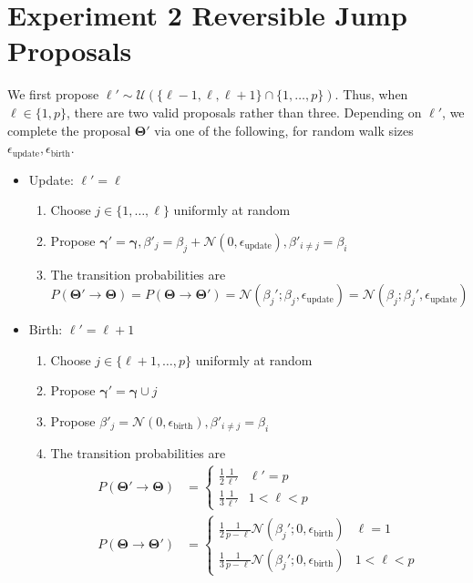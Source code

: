 \documentclass[a4paper,12pt]{article}
\begin{document}



\appendix
\section{Experiment 2 Reversible Jump Proposals}
\label{appendix:ex2}
We first propose $\ell' \sim \mathcal{U}(\{\ell-1, \ell, \ell+1\} \cap \{1, \ldots, p\} )$. Thus, when $\ell \in \{1,p\}$, there are two valid proposals rather than three. Depending on $\ell'$, we complete the proposal $\mathbf{\Theta}'$ via one of the following, for random walk sizes $\epsilon_{\text{update}}, \epsilon_{\text{birth}}$.
\begin{itemize}
    \item Update: $\ell' = \ell$
    \begin{enumerate}
        \item Choose $j \in \{1, \ldots, \ell\}$ uniformly at random
        \item Propose $\mathbf{\gamma}' = \mathbf{\gamma}, \beta'_{j} = \beta_{j} + \mathcal{N}(0, \epsilon_{\text{update}}), \beta'_{i \neq j} = \beta_{i}$
        \item The transition probabilities are $$P(\mathbf{\Theta}' \rightarrow \mathbf{\Theta}) = P(\mathbf{\Theta} \rightarrow \mathbf{\Theta}')=\mathcal{N}(\beta_{j}'; \beta_{j},\epsilon_{\text{update}})=\mathcal{N}(\beta_{j}; \beta_{j}',\epsilon_{\text{update}})$$
    \end{enumerate}
\end{itemize}

\begin{itemize}
    \item Birth: $\ell' = \ell+1$
    \begin{enumerate}
        \item Choose $j \in \{\ell+1, \ldots, p\}$ uniformly at random
        \item Propose $\mathbf{\gamma}' = \mathbf{\gamma} \cup j$
        \item Propose $\beta'_{j} = \mathcal{N}(0, \epsilon_{\text{birth}}), \beta'_{i \neq j} = \beta_{i}$
        \item The transition probabilities are
        \begin{align*}
            P(\mathbf{\Theta}' \rightarrow \mathbf{\Theta}) &= \begin{cases}\frac{1}{2}\frac{1}{\ell'} & \ell'=p \\ \frac{1}{3} \frac{1}{\ell'} & 1<\ell<p \end{cases} \\
            P(\mathbf{\Theta} \rightarrow \mathbf{\Theta}') &= \begin{cases}\frac{1}{2}\frac{1}{p-\ell} \mathcal{N}(\beta_{j}'; 0,\epsilon_{\text{birth}}) & \ell=1 \\ \frac{1}{3} \frac{1}{p-\ell} \mathcal{N}(\beta_{j}'; 0,\epsilon_{\text{birth}}) & 1<\ell<p \end{cases} 
        \end{align*}
    \end{enumerate}
\end{itemize}
\end{document}
